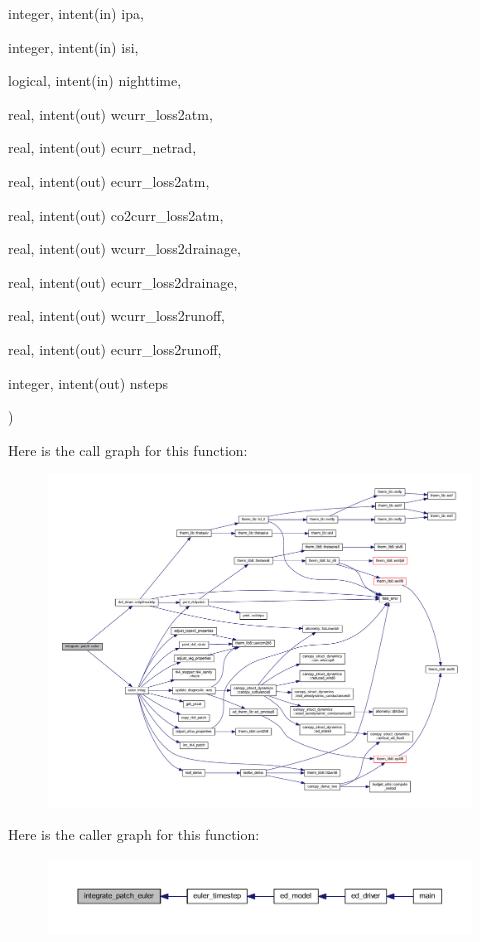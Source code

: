 {\begin{DoxyParamCaption}
\item[{integer, intent(in)}]{ipa, }
\item[{integer, intent(in)}]{isi, }
\item[{logical, intent(in)}]{nighttime, }
\item[{real, intent(out)}]{wcurr\+\_\+loss2atm, }
\item[{real, intent(out)}]{ecurr\+\_\+netrad, }
\item[{real, intent(out)}]{ecurr\+\_\+loss2atm, }
\item[{real, intent(out)}]{co2curr\+\_\+loss2atm, }
\item[{real, intent(out)}]{wcurr\+\_\+loss2drainage, }
\item[{real, intent(out)}]{ecurr\+\_\+loss2drainage, }
\item[{real, intent(out)}]{wcurr\+\_\+loss2runoff, }
\item[{real, intent(out)}]{ecurr\+\_\+loss2runoff, }
\item[{integer, intent(out)}]{nsteps}
\end{DoxyParamCaption}
)}\hypertarget{euler__driver_8f90_a284012473d288e2474d9eaebf1456c2a}{}\label{euler__driver_8f90_a284012473d288e2474d9eaebf1456c2a}


Here is the call graph for this function\+:\nopagebreak
\begin{figure}[H]
\begin{center}
\leavevmode
\includegraphics[width=350pt]{euler__driver_8f90_a284012473d288e2474d9eaebf1456c2a_cgraph}
\end{center}
\end{figure}




Here is the caller graph for this function\+:\nopagebreak
\begin{figure}[H]
\begin{center}
\leavevmode
\includegraphics[width=350pt]{euler__driver_8f90_a284012473d288e2474d9eaebf1456c2a_icgraph}
\end{center}
\end{figure}


